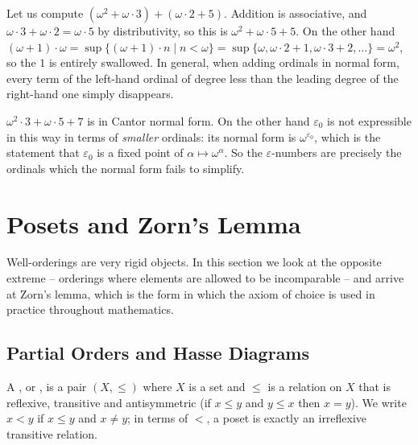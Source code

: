 \documentclass[a4paper]{scrartcl}
\begin{document}
\begin{example}
  Let us compute $(\omega^2 + \omega\cdot 3) + (\omega \cdot 2 + 5)$. Addition is associative, and $\omega\cdot 3 + \omega\cdot 2 = \omega\cdot 5$ by distributivity, so this is $\omega^2 + \omega\cdot 5 + 5$. On the other hand $(\omega + 1) \cdot \omega = \sup\{(\omega+1)\cdot n \mid n < \omega\} = \sup\{\omega, \omega\cdot 2 + 1, \omega \cdot 3 + 2, \dots\} = \omega^2$, so the $1$ is entirely swallowed. In general, when adding ordinals in normal form, every term of the left-hand ordinal of degree less than the leading degree of the right-hand one simply disappears.
\end{example}

\begin{example}
  $\omega^2 \cdot 3 + \omega \cdot 5 + 7$ is in Cantor normal form. On the other hand $\varepsilon_0$ is not expressible in this way in terms of \emph{smaller} ordinals: its normal form is $\omega^{\varepsilon_0}$, which is the statement that $\varepsilon_0$ is a fixed point of $\alpha \mapsto \omega^\alpha$. So the $\varepsilon$-numbers are precisely the ordinals which the normal form fails to simplify.
\end{example}

\section{Posets and Zorn's Lemma}\label{sec:zorn}

Well-orderings are very rigid objects. In this section we look at the opposite extreme -- orderings where elements are allowed to be incomparable -- and arrive at Zorn's lemma, which is the form in which the axiom of choice is used in practice throughout mathematics.

\subsection{Partial Orders and Hasse Diagrams}

\begin{definition}[Poset]
  A , or , is a pair $(X, \leq)$ where $X$ is a set and $\leq$ is a relation on $X$ that is reflexive, transitive and antisymmetric (if $x \leq y$ and $y \leq x$ then $x = y$). We write $x < y$ if $x \leq y$ and $x \neq y$; in terms of $<$, a poset is exactly an irreflexive transitive relation.
\end{definition}
\end{document}
